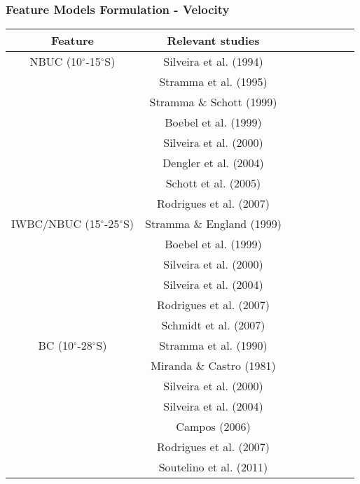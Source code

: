 \documentclass{beamer}
\begin{document}
\frame
{
  \frametitle{Feature Models Formulation - Velocity}

    \begin{tiny}
    \begin{center}
    \renewcommand{\arraystretch}{1.2}
    \renewcommand{\tabcolsep}{2mm}
    \begin{tabular}{cccccccc}
        \hline
        \hline
        Feature & Relevant studies \\
        \hline
        NBUC (10$^\circ$-15$^\circ$S) & Silveira et al. (1994) \\
               & Stramma et al. (1995) \\
               & Stramma \& Schott (1999) \\
               & Boebel et al. (1999) \\
               & Silveira et al. (2000) \\
               & Dengler et al. (2004) \\
               & Schott et al. (2005) \\
               & Rodrigues et al. (2007) \\
        \hline
        IWBC/NBUC (15$^\circ$-25$^\circ$S) & Stramma \& England (1999) \\
               & Boebel et al. (1999) \\
               & Silveira et al. (2000) \\
               & Silveira et al. (2004) \\
               & Rodrigues et al. (2007) \\
               & Schmidt et al. (2007) \\
        \hline
        BC (10$^\circ$-28$^\circ$S)& Stramma et al. (1990) \\
           & Miranda \& Castro (1981) \\
           & Silveira et al. (2000) \\
           & Silveira et al. (2004) \\
           & Campos (2006) \\
           & Rodrigues et al. (2007) \\
           & Soutelino et al. (2011) \\
        \hline
    \end{tabular}
    \end{center}
    \end{tiny}
}
\end{document}
